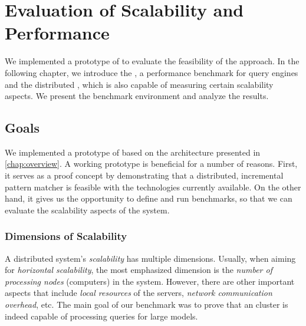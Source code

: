 \chapter{Evaluation of Scalability and Performance}
\label{chap:evaluation}

We implemented a prototype of \iqd{} to evaluate the feasibility of the approach. In the following chapter, we introduce the \tb{}, a performance benchmark for query engines and the distributed \tb{}, which is also capable of measuring certain scalability aspects. We present the benchmark environment and analyze the results.


\section{Goals}

We implemented a prototype of \iqd{} based on the architecture presented in \autoref{chap:overview}. A working prototype is beneficial for a number of reasons. First, it serves as a proof concept by demonstrating that a distributed, incremental pattern matcher is feasible with the technologies currently available.
On the other hand, it gives us the opportunity to define and run benchmarks, so that we can evaluate the scalability aspects of the system.

\subsection{Dimensions of Scalability}

A distributed system's \emph{scalability} has multiple dimensions. Usually, when aiming for \emph{horizontal scalability}, the most emphasized dimension is the \emph{number of processing nodes} (computers) in the system. However, there are other important aspects that include \emph{local resources} of the servers, \emph{network communication overhead}, etc. The main goal of our benchmark was to prove that an \iqd{} cluster is indeed capable of processing queries for large models.


\section{\tb{}}
\label{trainbenchmark}

